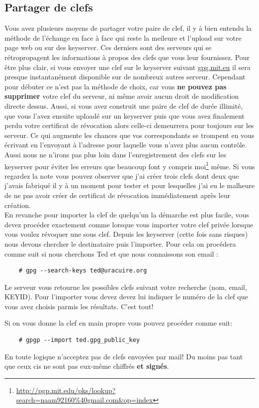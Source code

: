\documentclass[a4paper]{article}
\begin{document}
\subsection{Partager de clefs}
Vous avez plusieurs moyens de partager votre paire de clef, il y à bien
entendu la méthode de l'échange en face à face qui reste la meileure et l'upload
sur votre page web ou sur des keyserver. Ces derniers sont des serveurs qui
se rétropropagent les informations à propos des clefs que vous leur fournissez.
Pour être plus clair, si vous envoyer une clef sur le keyserver suivant
\url{gpg.mit.eu} il sera presque instantanément disponible sur de nombreux autres
serveur. Cependant pour débuter ce n'est pas la méthode de choix, car vous
\textbf{ne pouvez pas supprimer} votre clef du serveur, ni même avoir aucun droit de
modification directe dessus. Aussi, si vous avez construit une paire de clef
de durée illimité,
que vous l'avez ensuite uploadé sur un keyserver puis que vous avez finalement
perdu votre certificat de révocation alors celle-ci demeurrera pour toujours
sur les serveur. Ce qui augmente les chances que vos correspondants se trompent
en vous écrivant en l'envoyant à l'adresse pour laquelle vous n'avez plus aucun
contrôle.
Aussi nous ne n'irons pas plus loin dans l'enregistrement des clefs sur les
keyserver pour éviter les erreurs que beaucoup font y compris moi\footnote{\url{http://pgp.mit.edu/pks/lookup?search=naam92160\%40gmail.com\&op=index}}
même. Si vous regardez la note vous pouvez observer que j'ai créer trois clefs
dont deux que j'avais fabriqué il y à un moment pour tester et pour lesquelles
j'ai eu le malheure de ne pas avoir créer de certificat de révocation
immédiatement après leur création.
\\
En revanche pour importer la clef de quelqu'un la démarche est plus facile,
vous devez procéder exactement comme lorsque vous importer votre clef privée
lorsque vous voulez révoquer une sous clef. Depuis les keyserver (cette fois
sans risques) nous devons chercher le destinataire puis l'importer. Pour cela
on procédera comme suit si nous cherchons Ted et que nous connaissons son email :
\begin{verbatim}
    # gpg --search-keys ted@uracuire.org
\end{verbatim}
Le serveur vous retourne les possibles clefs suivant votre recherche (nom,
email, \textsc{KEYID}). Pour l'importer vous devez devez lui indiquer le numéro
de la clef que vous avez choisis parmis les résultats. C'est tout!

Si on vous donne la clef en main propre vous pouvez procéder comme suit:
\begin{verbatim}
    # gpgp --import ted.gpg_public_key
\end{verbatim}
En toute logique n'acceptez pas de clefs envoyées par mail! Du moins pas tant
que ceux cis ne sont pas eux-même chiffrés \textbf{et signés}.
\newpage
\end{document}
